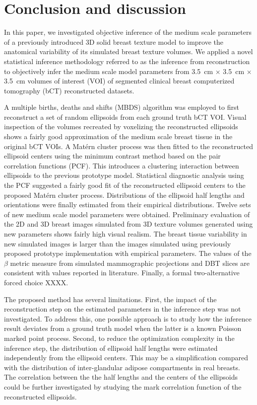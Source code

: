 \documentclass[journal]{IEEEtran}
\begin{document}
\section{Conclusion and discussion}
\label{sec:concl-disc}

In this paper, we investigated objective inference of the medium scale
parameters of a previously introduced 3D solid breast texture model to
improve the anatomical variability of its simulated breast texture
volumes. We applied a novel statistical inference methodology referred
to as the inference from reconstruction to objectively infer the
medium scale model parameters from \SI{3.5}{\cm} $\times$
\SI{3.5}{\cm} $\times$ \SI{3.5}{\cm} volumes of interest (VOI) of
segmented clinical breast computerized tomography (bCT) reconstructed
datasets.

A multiple births, deaths and shifts (MBDS) algorithm was employed to
first reconstruct a set of random ellipsoids from each ground truth
bCT VOI. Visual inspection of the volumes recreated by voxelizing the
reconstructed ellipsoids shows a fairly good approximation of the
medium scale breast tissue in the original bCT VOIs. A Mat\'{e}rn
cluster process was then fitted to the reconstructed ellipsoid centers
using the minimum contrast method based on the pair correlation
functions (PCF). This introduces a clustering interaction between
ellipsoids to the previous prototype model. Statistical diagnostic
analysis using the PCF suggested a fairly good fit of the
reconstructed ellipsoid centers to the proposed Mat\'{e}rn cluster
process. Distributions of the ellipsoid half lengths and orientations
were finally estimated from their empirical distributions. Twelve sets
of new medium scale model parameters were obtained. Preliminary
evaluation of the 2D and 3D breast images simulated from 3D texture
volumes generated using new parameters shows fairly high visual
realism. The breast tissue variability in new simulated images is
larger than the images simulated using previously proposed prototype
implementation with empirical parameters. The values of the $\beta$
metric measure from simulated mammographic projections and DBT slices
are consistent with values reported in literature. Finally, a formal
two-alternative forced choice XXXX.

The proposed method has several limitations. First, the impact of the
reconstruction step on the estimated parameters in the inference step
was not investigated. To address this, one possible approach is to
study how the inference result deviates from a ground truth model when
the latter is a known Poisson marked point process. Second, to reduce
the optimization complexity in the inference step, the distribution of
ellipsoid half lengths were estimated independently from the ellipsoid
centers. This may be a simplification compared with the distribution
of inter-glandular adipose compartments in real breasts. The
correlation between the the half lengths and the centers of the
ellipsoids could be further investigated by studying the mark
correlation function of the reconstructed ellipsoids.
\end{document}

